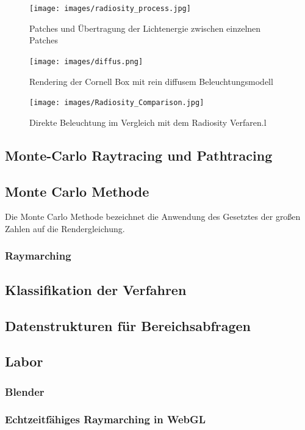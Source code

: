  \begin{figure}[H]
    \centering
    \texttt{[image: images/radiosity\_process.jpg]}
    \caption{Patches und Übertragung der Lichtenergie zwischen einzelnen Patches}
    \label{fig:diffus}
\end{figure}

 \begin{figure}[H]
    \centering
    \texttt{[image: images/diffus.png]}
    \caption{Rendering der Cornell Box mit rein diffusem Beleuchtungsmodell}
    \label{fig:diffus}
\end{figure}

 \begin{figure}[H]
    \centering
    \texttt{[image: images/Radiosity\_Comparison.jpg]}
    \caption{Direkte Beleuchtung im Vergleich mit dem Radiosity Verfaren.l}
    \label{fig:diffus}
\end{figure}
\subsection{Monte-Carlo Raytracing und Pathtracing}


\begin{figure}[H]\centering
    \hspace*{0.1\textwidth}
\end{figure}


\subsection{Monte Carlo Methode}
Die Monte Carlo Methode bezeichnet die Anwendung des  Gesetztes der großen Zahlen auf die Rendergleichung.


\subsubsection{Raymarching}
\subsection{Klassifikation der Verfahren}

\subsection{Datenstrukturen für Bereichsabfragen}


\subsection{Labor}
\subsubsection{Blender}
\subsubsection{Echtzeitfähiges Raymarching in WebGL}
